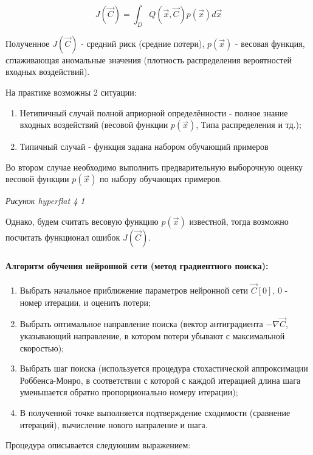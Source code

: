 \documentclass{article}
\begin{document}
\begin{equation}
    J(\vec{C}) = \int_{D} Q(\vec{x}, \vec{C}) p(\vec{x}) d\vec{x}
\end{equation}

Полученное $J(\vec{C})$ - средний риск (средние потери), $p(\vec{x})$ - весовая функция, сглаживающая аномальные значения (плотность распределения вероятностей входных воздействий).

На практике возможны 2 ситуации:
\begin{enumerate}
    \item Нетипичный случай полной априорной определённости - полное знание входных воздействий (весовой функции $p(\vec{x})$, Типа распределения и тд.);
    \item Типичный случай - функция задана набором обучающий примеров
\end{enumerate}

Во втором случае необходимо выполнить предварительную выборочную оценку весовой функции $p(\vec{x})$ по набору обучающих примеров.
\begin{myquote}
    \textit{Рисунок hyperflat 4 1}
\end{myquote}

Однако, будем считать весовую функцию $p(\vec{x})$ известной, тогда возможно посчитать функционал ошибок $J(\vec{C})$.

\paragraph{Алгоритм обучения нейронной сети (метод градиентного поиска):}
\begin{enumerate}
    \item Выбрать начальное приближение параметров нейронной сети $\vec{C}[0]$, $0$ - номер итерации, и оценить потери;
    \item Выбрать оптимальное направление поиска (вектор антиградиента $-\nabla\vec{C}$, указывающий направление, в котором потери убывают с максимальной скоростью);
    \item Выбрать шаг поиска (используется процедура стохастической аппроксимации Роббенса-Монро, в соответствии с которой с каждой итерацией длина шага уменьшается обратно пропорционально номеру итерации);
    \item[] В полученной точке выполняется подтверждение сходимости (сравнение итераций), вычисление нового напраление и шага.
\end{enumerate}

Процедура описывается следуюшим выражением:
\end{document}
